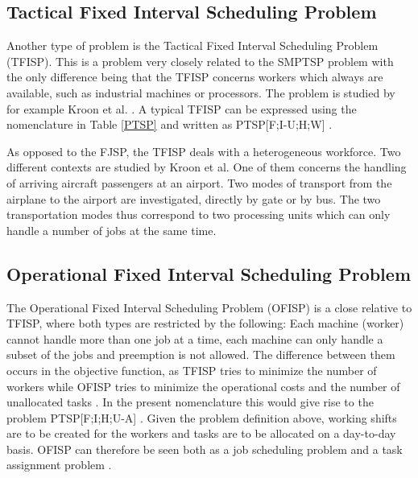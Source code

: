 	
\subsection{Tactical Fixed Interval Scheduling Problem}
Another type of problem is the Tactical Fixed Interval Scheduling Problem (TFISP). This is a problem very closely related to the SMPTSP problem with the only difference being that the TFISP concerns workers which always are available, such as industrial machines or processors. The problem is studied by for example Kroon et al. \citet{kroon_1995}. A typical TFISP can be expressed using the nomenclature in Table \ref{PTSP} and written as PTSP[F;I-U;H;W] \citet{krishnamoorthy_2001}.

As opposed to the FJSP, the TFISP deals with a heterogeneous workforce. Two different contexts are studied by Kroon et al. One of them concerns the handling of arriving aircraft passengers at an airport. Two modes of transport from the airplane to the airport are investigated, directly by gate or by bus. The two transportation modes thus correspond to two processing units which can only handle a number of jobs at the same time.

\subsection{Operational Fixed Interval Scheduling Problem}
The Operational Fixed Interval Scheduling Problem (OFISP) is a close relative to TFISP, where both types are restricted by the following: Each machine (worker) cannot handle more than one job at a time, each machine can only handle a subset of the jobs and preemption is not allowed. The difference between them occurs in the objective function, as TFISP tries to minimize the number of workers while OFISP tries to minimize the operational costs and the number of unallocated tasks \citet{kroon_1995}. In the present nomenclature this would give rise to the problem PTSP[F;I;H;U-A] \citet{krishnamoorthy_2001}. Given the problem definition above, working shifts are to be created for the workers and tasks are to be allocated on a day-to-day basis. OFISP can therefore be seen both as a job scheduling problem and a task assignment problem \citet{kroon_1995}.



